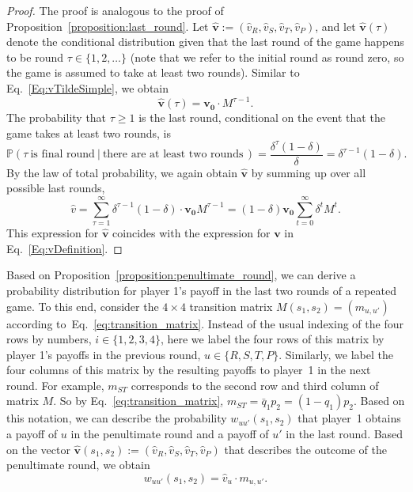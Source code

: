 \documentclass[11pt]{article}
\def\strategy{s}
\theoremstyle{plainCl1}
\theoremstyle{plainCl2}
\begin{document}
\begin{proof}
The proof is analogous to the proof of Proposition~\ref{proposition:last_round}. 
Let $\mathbf{\hat{v}}:=(\hat{v}_R, \hat{v}_S, \hat{v}_T, \hat{v}_P)$, and let $\mathbf{\hat{v}}(\tau)$ denote the conditional distribution given that  the last round of the game happens to be round $\tau\!\in\!\{1,2,\ldots\}$ (note that we refer to the initial round as round zero, so the game is assumed to take at least two rounds). 
Similar to Eq.~\eqref{Eq:vTildeSimple}, we obtain
\begin{equation}
\mathbf{\hat v}(\tau) = \mathbf{v_0}\cdot M^{\tau-1}.
\end{equation}
The probability that $\tau\!\ge\!1$ is the last round, conditional on the event that the game takes at least two rounds, is 
$$ \mathbb{P}(\tau ~\text{is final round}~|~\text{there are at least two rounds}\,) = \frac{\delta^\tau(1\!-\!\delta)}{\delta} =  \delta^{\tau-1}(1\!-\!\delta).$$
By the law of total probability, we again obtain $\mathbf{\hat{v}}$ by summing up over all possible last rounds,
\begin{equation}
\hat{v} = \sum_{\tau=1}^\infty \delta^{\tau-1}(1\!-\!\delta)  \cdot \mathbf{v_0}M^{\tau-1} 
=  (1\!-\!\delta)\mathbf{v_0} \sum_{t=0}^\infty \delta^t  M^t. 
\end{equation}
This expression for $\mathbf{\hat{v}}$ coincides with the expression for $\mathbf{v}$ in Eq.~\eqref{Eq:vDefinition}.
\end{proof}

\noindent
Based on Proposition~\ref{proposition:penultimate_round}, we can derive a probability distribution for player 1's payoff in the last two rounds of a repeated game. 
To this end, consider the $4\times4$ transition matrix $M(\strategy_1,\strategy_2)=(m_{u,u'})$ according to~Eq.~\eqref{eq:transition_matrix}. 
Instead of the usual indexing of the four rows by numbers, $i\!\in\!\{1,2,3,4\}$, here we label the four rows of this matrix by player 1's payoffs in the previous round, $u\!\in\!\{R,S,T,P\}$. 
Similarly, we label the four columns of this matrix by the resulting payoffs to player~1 in the next round. 
For example, $m_{ST}$ corresponds to the second row and third column of matrix $M$. 
So by Eq.~\eqref{eq:transition_matrix}, $m_{ST} = \bar{q}_1 p_2=(1\!-\!q_1)p_2$.
Based on this notation, we can describe the probability $w_{uu'}(\strategy_1,\strategy_2)$ that player~1 obtains a payoff of $u$ in the penultimate round and a payoff of $u'$ in the last round. 
Based on the vector $\mathbf{\hat{v}}(\strategy_1,\strategy_2):=(\hat{v}_R, \hat{v}_S, \hat{v}_T, \hat{v}_P)$ that describes the outcome of the penultimate round, we obtain
\begin{equation}
w_{uu'}(\strategy_1,\strategy_2) = \hat{v}_u \cdot m_{u,u'}.
\end{equation}
 ~\\
 
\end{document}
